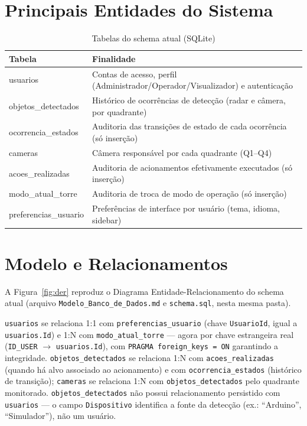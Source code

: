 \section{Principais Entidades do Sistema}

\begin{table}[htbp]
  \centering
  \caption{Tabelas do schema atual (SQLite)}
  \label{tab:entidades}
  \small
  \renewcommand{\arraystretch}{1.2}
  \begin{tabular}{p{3.6cm}p{8.4cm}}
    \hline
    \textbf{Tabela} & \textbf{Finalidade} \\
    \hline
    usuarios & Contas de acesso, perfil (Administrador/Operador/Visualizador) e autenticação \\
    objetos\_detectados & Histórico de ocorrências de detecção (radar e câmera, por quadrante) \\
    ocorrencia\_estados & Auditoria das transições de estado de cada ocorrência (só inserção) \\
    cameras & Câmera responsável por cada quadrante (Q1--Q4) \\
    acoes\_realizadas & Auditoria de acionamentos efetivamente executados (só inserção) \\
    modo\_atual\_torre & Auditoria de troca de modo de operação (só inserção) \\
    preferencias\_usuario & Preferências de interface por usuário (tema, idioma, sidebar) \\
    \hline
  \end{tabular}
\end{table}

\section{Modelo e Relacionamentos}
\label{sec:modelo}

A Figura~\ref{fig:der} reproduz o Diagrama Entidade-Relacionamento do schema atual (arquivo
\texttt{Modelo\_Banco\_de\_Dados.md} e \texttt{schema.sql}, nesta mesma pasta).

\texttt{usuarios} se relaciona 1:1 com \texttt{preferencias\_usuario} (chave \texttt{UsuarioId},
igual a \texttt{usuarios.Id}) e 1:N com \texttt{modo\_atual\_torre} — agora por chave estrangeira
real (\texttt{ID\_USER} $\rightarrow$ \texttt{usuarios.Id}), com \texttt{PRAGMA foreign\_keys =
ON} garantindo a integridade. \texttt{objetos\_detectados} se relaciona 1:N com
\texttt{acoes\_realizadas} (quando há alvo associado ao acionamento) e com
\texttt{ocorrencia\_estados} (histórico de transição); \texttt{cameras} se relaciona 1:N com
\texttt{objetos\_detectados} pelo quadrante monitorado. \texttt{objetos\_detectados} não possui
relacionamento persistido com \texttt{usuarios} — o campo \texttt{Dispositivo} identifica a fonte
da detecção (ex.: ``Arduino'', ``Simulador''), não um usuário.

